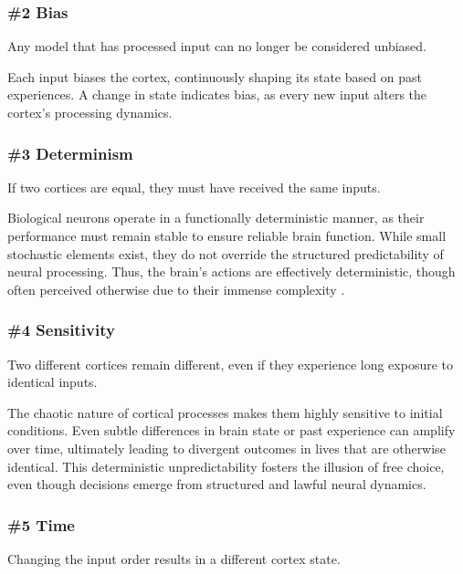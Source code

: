 \documentclass{article}
\newenvironment{one_assertion}[1]
{
  \begin{tabular}{p{1.5cm}p{8.2cm}}
    \textbf{Assertion:} & #1 \\
}{
  \end{tabular}\\
}
\begin{document}
\subsubsection*{\#2 Bias}
\begin{one_assertion}
    {Any model that has processed input can no longer be considered unbiased.}
\end{one_assertion}

Each input biases the cortex, continuously shaping its state based on past experiences. A change in state indicates bias, as every new input alters the cortex's processing dynamics.

\subsubsection*{\#3 Determinism}
\begin{one_assertion}
    {If two cortices are equal, they must have received the same inputs.}
\end{one_assertion}

Biological neurons operate in a functionally deterministic manner, as their performance must remain stable to ensure reliable brain function. While small stochastic elements exist, they do not override the structured predictability of neural processing. Thus, the brain's actions are effectively deterministic, though often perceived otherwise due to their immense complexity \cite{AtlanticFreeWill}.

\subsubsection*{\#4 Sensitivity}
\begin{one_assertion}
    {Two different cortices remain different, even if they experience long exposure to identical inputs.}
\end{one_assertion}

The chaotic nature of cortical processes makes them highly sensitive to initial conditions. Even subtle differences in brain state or past experience can amplify over time, ultimately leading to divergent outcomes in lives that are otherwise identical. This deterministic unpredictability fosters the illusion of free choice, even though decisions emerge from structured and lawful neural dynamics.

\subsubsection*{\#5 Time}
\begin{one_assertion}
    {Changing the input order results in a different cortex state.}
\end{one_assertion}
\end{document}

